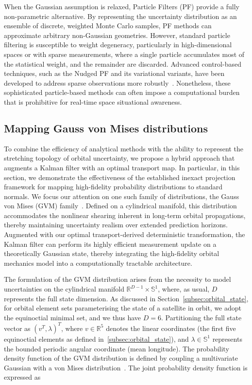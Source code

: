 When the Gaussian assumption is relaxed, Particle Filters (PF) provide a fully non-parametric alternative. By representing the uncertainty distribution as an ensemble of discrete, weighted Monte Carlo samples, PF methods can approximate arbitrary non-Gaussian geometries. However, standard particle filtering is susceptible to weight degeneracy, particularly in high-dimensional spaces or with sparse measurements, where a single particle accumulates most of the statistical weight, and the remainder are discarded. Advanced control-based techniques, such as the Nudged PF and its variational variants, have been developed to address sparse observations more robustly~\cite{Karampela2026}. Nonetheless, these sophisticated particle-based methods can often impose a computational burden that is prohibitive for real-time space situational awareness.

\subsection{Mapping Gauss von Mises distributions} \label{subsec:mapping_gauss_von_mises}

To combine the efficiency of analytical methods with the ability to represent the stretching topology of orbital uncertainty, we propose a hybrid approach that augments a Kalman filter with an optimal transport map. In particular, in this section, we demonstrate the effectiveness of the established inexact projection framework for mapping high-fidelity probability distributions to standard normals. We focus our attention on one such family of distributions, the Gauss von Mises (GVM) family~\cite{Horwood2014}. Defined on a cylindrical manifold, this distribution accommodates the nonlinear shearing inherent in long-term orbital propagations, thereby maintaining uncertainty realism over extended prediction horizons. Augmented with our optimal transport-derived deterministic transformation, the Kalman filter can perform its highly efficient measurement update on a theoretically Gaussian state, thereby integrating the high-fidelity orbital mechanics model into a computationally tractable architecture.

The formulation of the GVM distribution arises from the necessity to model uncertainties on the cylindrical manifold $\mathbb{R}^{D-1} \times \mathbb{S}^1$, where, as usual, $D$ represents the full state dimension. As discussed in Section~\ref{subsec:orbital_state}, for orbital element sets parameterising the state of a satellite in orbit, we adopt the equinoctial minimal set, and we thus have $D=6$. Partitioning the full state vector as $(v^T, \lambda)^T$, where $v \in \mathbb{R}^{5}$ denotes the linear coordinates (the first five equinoctial elements as defined in~\ref{subsec:orbital_state}), and $\lambda \in \mathbb{S}^1$ represents the bounded periodic angular coordinate (mean longitude). The probability density function of the GVM distribution is defined by coupling a multivariate Gaussian with a von Mises distribution~\cite{Horwood2014}. The joint probability density function is expressed as

